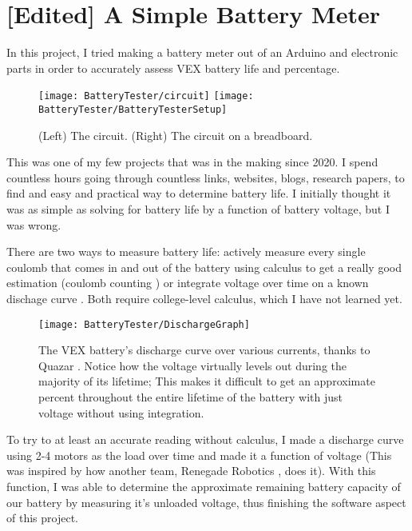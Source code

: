 \section{[Edited] A Simple Battery Meter}
In this project, I tried making a battery meter out of an Arduino and electronic parts in order to accurately assess VEX battery life and percentage.

\begin{figure}[h]
    \centering
    \texttt{[image: BatteryTester/circuit]}
    \texttt{[image: BatteryTester/BatteryTesterSetup]}
    \caption{
        (Left) The circuit. (Right) The circuit on a breadboard.
    }
\end{figure}

This was one of my few projects that was in the making since 2020. I spend countless hours going through countless links, websites, blogs, research papers, to find and easy and practical way to determine battery life. I initially thought it was as simple as solving for battery life by a function of battery voltage, but I was wrong.

There are two ways to measure battery life: actively measure every single coulomb that comes in and out of the battery using calculus to get a really good estimation (coulomb counting \cite{CoulombCounting}) or integrate voltage over time on a known dischage curve \cite{IntegrationVoltage}. Both require college-level calculus, which I have not learned yet.

\begin{figure}[h]
    \centering
    \texttt{[image: BatteryTester/DischargeGraph]}
    \caption{
        The VEX battery's discharge curve over various currents, thanks to Quazar \cite{Quazar}. Notice how the voltage virtually levels out during the majority of its lifetime; This makes it difficult to get an approximate percent throughout the entire lifetime of the battery with just voltage without using integration.
    }
\end{figure}

To try to at least an accurate reading without calculus, I made a discharge curve using 2-4 motors as the load over time and made it a function of voltage (This was inspired by how another team, Renegade Robotics \cite{RenegadeRobotics}, does it). With this function, I was able to determine the approximate remaining battery capacity of our battery by measuring it's unloaded voltage, thus finishing the software aspect of this project.

